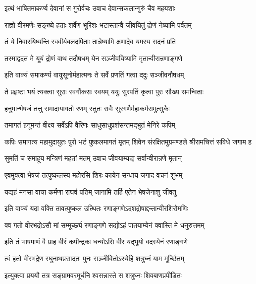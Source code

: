 
\twolineshloka
{इत्थं भाषितमाकर्ण्य देवानां स गुरोर्वचः}
{उवाच देवान्सकलान्गुरुं चैव महयशाः}%

\twolineshloka
{राज्ञो वीरमणेः सङ्ख्ये हताः शर्वेण भूरिशः}
{भटास्तान्वै जीवयितुं द्रोणं नेष्यामि पर्वतम्}%

\twolineshloka
{तं ये निवारयिष्यन्ति स्ववीर्यबलदर्पिताः}
{तान्नेष्यामि क्षणादेव यमस्य सदनं प्रति}%

\twolineshloka
{तस्माद्वदत मे यूयं द्रोणं वाथ तदौषधम्}
{येन सञ्जीवयिष्यामि मृतान्वीरान्रणाङ्गणे}%


\twolineshloka
{इति वाक्यं समाकर्ण्य वायुसूनोर्महात्मनः}
{ते सर्वे प्रणतिं गत्वा ददुः सञ्जीवनौषधम्}%

\twolineshloka
{ते प्रहृष्टा भयं त्यक्त्वा सुराः स्वर्गौकसः स्वयम्}
{ययुः सुरपतिं कृत्वा पुरः सौख्य समन्विताः}%

\twolineshloka
{हनुमान्भेषजं तत्तु समादायागतो रणम्}
{स्तुतः सर्वैः सुरगणैर्महाकर्मसमुत्सुकैः}%

\twolineshloka
{तमागतं हनूमन्तं वीक्ष्य सर्वेऽपि वैरिणः}
{साधुसाधुप्रशंसन्तमद्भुतं मेनिरे कपिम्}%

\fourlineindentedshloka
{कपिः समागत्य महामुदायुतः}
{पुरो भटं पुष्कलमागतं मृतम्}
{शिवेन संरक्षितमुग्रमण्डले}
{श्रीरामचित्तं सविधे जगाम ह}%

\twolineshloka
{सुमतिं च समाहूय मन्त्रिणं महतां मतम्}
{उवाच जीवयाम्यद्य सर्वान्वीरान्रणे मृतान्}%

\twolineshloka
{एवमुक्त्वा भेषजं तत्पुष्कलस्य महोरसि}
{शिरः कायेन सन्धाय जगाद वचनं शुभम्}%

\twolineshloka
{यद्यहं मनसा वाचा कर्मणा राघवं पतिम्}
{जानामि तर्हि एतेन भेषजेनाशु जीवतु}%

\twolineshloka
{इति वाक्यं यदा वक्ति तावत्पुष्कल उत्थितः}
{रणाङ्गणेऽदशद्रोषाद्दन्तान्वीरशिरोमणिः}%

\twolineshloka
{क्व गतो वीरभद्रोऽसौ मां सम्मूर्च्छ्य रणाङ्गणे}
{सद्योऽहं पातयाम्येनं क्वास्ति मे धनुरुत्तमम्}%

\twolineshloka
{इति तं भाषमाणं वै प्राह वीरं कपीन्द्रकः}
{धन्योऽसि वीर यद्भूयो वदस्येनं रणाङ्गणे}%

\twolineshloka
{त्वं हतो वीरभद्रेण रघुनाथप्रसादतः}
{पुनः सञ्जीवितोऽस्येहि शत्रुघ्नं याम मूर्च्छितम्}%

\twolineshloka
{इत्युक्त्वा प्रययौ तत्र सङ्ग्रामवरमूर्धनि}
{श्वसन्नास्ते स शत्रुघ्नः शिवबाणप्रपीडितः}%

